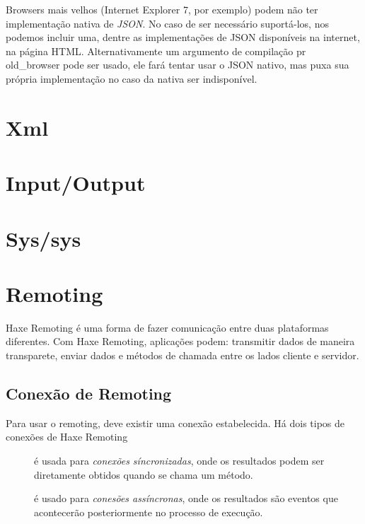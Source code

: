 {Browsers mais velhos (Internet Explorer 7, por exemplo) podem não ter implementação nativa de \emph{JSON}. No caso de ser necessário suportá-los, nos podemos incluir uma, dentre as implementações de JSON disponíveis na internet, na página HTML. Alternativamente um argumento de compilação pr{ old_browser} pode ser usado, ele fará  tentar usar o JSON nativo, mas puxa sua própria implementação no caso da nativa ser indisponível.

\section{Xml}
\label{std-Xml}

\section{Input/Output}
\label{std-input-output}

\section{Sys/sys}
\label{std-sys}

\section{Remoting}
\label{std-remoting}

Haxe Remoting é uma forma de fazer comunicação entre duas plataformas diferentes. Com Haxe Remoting, aplicações podem: transmitir dados de maneira transparete, enviar dados e métodos de chamada entre os lados cliente e servidor.

\subsection{Conexão de Remoting}
\label{std-remoting-connection}

Para usar o remoting, deve existir uma conexão estabelecida. Há dois tipos de conexões de Haxe Remoting
\begin{description}
    \item[] é usada para \emph{conexões síncronizadas}, onde os resultados podem ser diretamente obtidos quando se chama um método.
	\item[] é usado para \emph{conesões assíncronas}, onde os resultados são eventos que acontecerão posteriormente no processo de execução.
\end{description}

}
